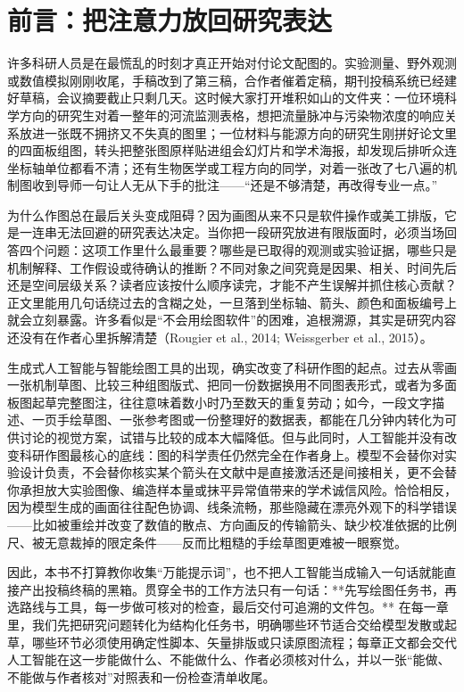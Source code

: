 \chapter*{前言：把注意力放回研究表达}

许多科研人员是在最慌乱的时刻才真正开始对付论文配图的。实验测量、野外观测或数值模拟刚刚收尾，手稿改到了第三稿，合作者催着定稿，期刊投稿系统已经建好草稿，会议摘要截止只剩几天。这时候大家打开堆积如山的文件夹：一位环境科学方向的研究生对着一整年的河流监测表格，想把流量脉冲与污染物浓度的响应关系放进一张既不拥挤又不失真的图里；一位材料与能源方向的研究生刚拼好论文里的四面板组图，转头把整张图原样贴进组会幻灯片和学术海报，却发现后排听众连坐标轴单位都看不清；还有生物医学或工程方向的同学，对着一张改了七八遍的机制图收到导师一句让人无从下手的批注——“还是不够清楚，再改得专业一点。”

为什么作图总在最后关头变成阻碍？因为画图从来不只是软件操作或美工排版，它是一连串无法回避的研究表达决定。当你把一段研究放进有限版面时，必须当场回答四个问题：这项工作里什么最重要？哪些是已取得的观测或实验证据，哪些只是机制解释、工作假设或待确认的推断？不同对象之间究竟是因果、相关、时间先后还是空间层级关系？读者应该按什么顺序读完，才能不产生误解并抓住核心贡献？正文里能用几句话绕过去的含糊之处，一旦落到坐标轴、箭头、颜色和面板编号上就会立刻暴露。许多看似是“不会用绘图软件”的困难，追根溯源，其实是研究内容还没有在作者心里拆解清楚（Rougier et al., 2014; Weissgerber et al., 2015）。

生成式人工智能与智能绘图工具的出现，确实改变了科研作图的起点。过去从零画一张机制草图、比较三种组图版式、把同一份数据换用不同图表形式，或者为多面板图起草完整图注，往往意味着数小时乃至数天的重复劳动；如今，一段文字描述、一页手绘草图、一张参考图或一份整理好的数据表，都能在几分钟内转化为可供讨论的视觉方案，试错与比较的成本大幅降低。但与此同时，人工智能并没有改变科研作图最核心的底线：图的科学责任仍然完全在作者身上。模型不会替你对实验设计负责，不会替你核实某个箭头在文献中是直接激活还是间接相关，更不会替你承担放大实验图像、编造样本量或抹平异常值带来的学术诚信风险。恰恰相反，因为模型生成的画面往往配色协调、线条流畅，那些隐藏在漂亮外观下的科学错误——比如被重绘并改变了数值的散点、方向画反的传输箭头、缺少校准依据的比例尺、被无意裁掉的限定条件——反而比粗糙的手绘草图更难被一眼察觉。

因此，本书不打算教你收集“万能提示词”，也不把人工智能当成输入一句话就能直接产出投稿终稿的黑箱。贯穿全书的工作方法只有一句话：**先写绘图任务书，再选路线与工具，每一步做可核对的检查，最后交付可追溯的文件包。** 在每一章里，我们先把研究问题转化为结构化任务书，明确哪些环节适合交给模型发散或起草，哪些环节必须使用确定性脚本、矢量排版或只读原图流程；每章正文都会交代人工智能在这一步能做什么、不能做什么、作者必须核对什么，并以一张“能做、不能做与作者核对”对照表和一份检查清单收尾。

